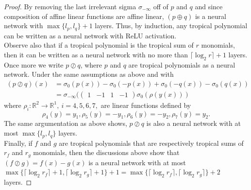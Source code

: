 \documentclass{article}
\theoremstyle{definition}
\begin{document}
\begin{proof}
By removing the last irrelevant sigma $\sigma_{- \infty}$ off of $p$ and $q$ and since composition of affine linear functions are affine linear, $(p\oplus q)$ is a neural network with $\max \{ l_{p}, l_{q} \} + 1$ layers. Thus, by induction, any tropical polynomial can be written as a neural network with ReLU activation. \\
Observe also that if a tropical polynomial is the tropical sum of $r$ monomials, then it can be written as a neural network with no more than
$\lceil \log_{2} r \rceil + 1$ layers. Once more we write $p \oslash q$, where $p$ and $q$ are tropical polynomials as a neural network. Under the same assumptions as above and with
\begin{align*}
(p \oslash q)(x)
&= \sigma_{0}(p(x)) - \sigma_{0}(-p(x)) + \sigma_{0}(-q(x)) - \sigma_{0}(q(x)) \\
&= \sigma_{- \infty }(\begin{pmatrix} 1 & -1 & 1 & -1 \end{pmatrix} \sigma_{0}(\rho(y(x)))
\end{align*}
where $\rho_{i}:\mathbb{R}^{2} \to \mathbb{R}^{1}, \ i=4,5,6,7,$ are linear functions defined by
$$\rho_{4}(y)=y_{1}, \rho_{5}(y)=-y_{1}, \rho_{6}(y)=-y_{2}, \rho_{7}(y)=y_{2}.$$
The same argumentation as above shows, $p \oslash q$ is also a neural network with at most $\max \{ l_{p}, l_{q} \}$ layers. \\
Finally, if $f$ and $g$ are tropical polynomials that are respectively tropical sums of $r_{f}$ and $r_{g}$ monomials, then the discussions
above show that $(f \oslash g) = f(x) - g(x)$ is a neural network with at most $\max \{ \lceil \log_{2}r_{f} \rceil + 1, \lceil \log_{2}r_g \rceil + 1 \} + 1 = \max \{ \lceil \log_{2}r_{f} \rceil, \lceil \log_{2}r_g \rceil \} + 2$ layers.
\end{proof}
\end{document}
